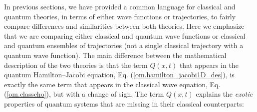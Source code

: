 \documentclass[onecolumn,nofootinbib, secnumarabic, amsmath, nobibnotes,11pt,aps,pra]{revtex4-1}
\newcommand{\eref}[1]{Eq. (\ref{#1})}
\begin{document}
In previous sections, we have provided a common language for
classical and quantum theories, in terms of either wave functions or
trajectories, to fairly compare differences and similarities between
both theories. Here we emphasize that we are comparing either
classical and quantum wave functions or classical and quantum
ensembles of trajectories (not a single classical trajectory with a
quantum wave function). The main difference between the mathematical
description of the two theories is that the term \textit{$Q(x,t)$}
that appears in the quantum Hamilton--Jacobi equation,
\eref{om.hamilton_jacobi1D_des}, is exactly the same term that
appears in the classical wave equation, \eref{om.classcho}, but with a
change of sign. The term \textit{$Q(x,t)$} explains the
\textit{exotic} properties of quantum systems that are missing in
their classical counterparts:
\end{document}
